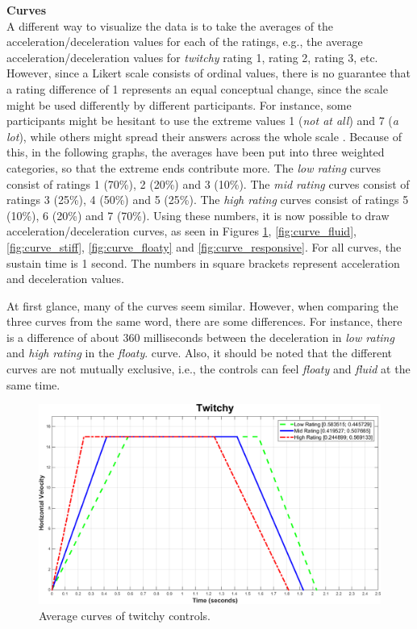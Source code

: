 \textbf{Curves}\\
A different way to visualize the data is to take the averages of the acceleration/deceleration values for each of the ratings, e.g., the average acceleration/deceleration values for \textit{twitchy} rating 1, rating 2, rating 3, etc. However, since a Likert scale consists of ordinal values, there is no guarantee that a rating difference of 1 represents an equal conceptual change, since the scale might be used differently by different participants. For instance, some participants might be hesitant to use the extreme values 1 (\textit{not at all}) and 7 (\textit{a lot}), while others might spread their answers across the whole scale \cite{cunningham}. Because of this, in the following graphs, the averages have been put into three weighted categories, so that the extreme ends contribute more. The \textit{low rating} curves consist of ratings 1 (70\%), 2 (20\%) and 3 (10\%). The \textit{mid rating} curves consist of ratings 3 (25\%), 4 (50\%) and 5 (25\%). The \textit{high rating} curves consist of ratings 5 (10\%), 6 (20\%) and 7 (70\%). Using these numbers, it is now possible to draw acceleration/deceleration curves, as seen in Figures \ref{fig:curve_twitchy}, \ref{fig:curve_fluid}, \ref{fig:curve_stiff}, \ref{fig:curve_floaty} and \ref{fig:curve_responsive}. For all curves, the sustain time is 1 second. The numbers in square brackets represent acceleration and deceleration values.

At first glance, many of the curves seem similar. However, when comparing the three curves from the same word, there are some differences. For instance, there is a difference of about 360 milliseconds between the deceleration in \textit{low rating} and \textit{high rating} in the \textit{floaty}. curve. Also, it should be noted that the different curves are not mutually exclusive, i.e., the controls can feel \textit{floaty} and \textit{fluid} at the same time.

\begin{figure}[htbp]
\centering
\includegraphics[width=0.9\columnwidth]{Pics/Curves/Twitchy_curve}
\caption{Average curves of twitchy controls.}
\label{fig:curve_twitchy}
\end{figure}

